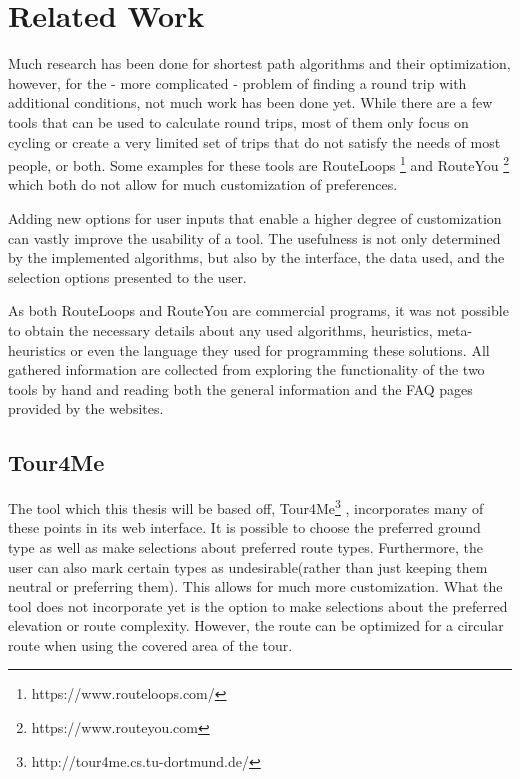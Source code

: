 \chapter{Related Work}
\label{chapter:relatedWork}


Much research has been done for shortest path algorithms and their optimization, however, for the - more complicated \cite{gemsa_efficient_2013} - problem of finding a round trip with additional conditions, not much work has been done yet.
While there are a few tools that can be used to calculate round trips, most of them only focus on cycling or create a very limited set of trips that do not satisfy the needs of most people, or both. 
Some examples for these tools are RouteLoops \footnote{https://www.routeloops.com/} and RouteYou \footnote{https://www.routeyou.com} which both do not allow for much customization of preferences. 

Adding new options for user inputs that enable a higher degree of customization can vastly improve the usability of a tool. 
The usefulness is not only determined by the implemented algorithms, but also by the interface, the data used, and the selection options presented to the user. 

As both RouteLoops and RouteYou are commercial programs, it was not possible to obtain the necessary details about any used algorithms, heuristics, meta-heuristics or even the language they used for programming these solutions.
All gathered information are collected from exploring the functionality of the two tools by hand and reading both the general information and the FAQ pages provided by the websites. 

\section{Tour4Me}
\label{sec:Tour4Me}

The tool which this thesis will be based off, Tour4Me\footnote{http://tour4me.cs.tu-dortmund.de/} \cite{buchin_tour4me_2022}, incorporates many of these points in its web interface. 
It is possible to choose the preferred ground type as well as make selections about preferred route types.
Furthermore, the user can also mark certain types as undesirable(rather than just keeping them neutral or preferring them).
This allows for much more customization.
What the tool does not incorporate yet is the option to make selections about the preferred elevation or route complexity.
However, the route can be optimized for a circular route when using the covered area of the tour. 

